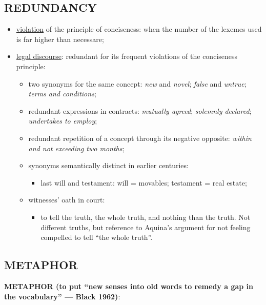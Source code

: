 \subsection{REDUNDANCY}

\begin{itemize}

\item \underline{violation} of the principle of conciseness: when the number of the lexemes used is far higher than necessare;
\item \underline{legal discourse}: redundant for its frequent violations of the conciseness principle:

\begin{itemize}

\item  two synonyms for the same concept: \textit{new} and \textit{novel}; \textit{false} and \textit{untrue}; \textit{terms and conditions};
\item redundant expressions in contracts: \textit{mutually agreed}; \textit{solemnly declared}; \textit{undertakes to employ};
\item redundant repetition of a concept through its negative opposite: \textit{within and not exceeding two months};
\item synonyms semantically distinct in earlier centuries:
\begin{itemize}
\item last will and testament: will = movables; testament = real estate;
\end{itemize}
\item witnesses’ oath in court:
\begin{itemize}
\item to tell the truth, the whole truth, and nothing than the truth. Not different truths, but reference to Aquina’s argument for not feeling compelled to tell “the whole truth”.
\end{itemize}
\end{itemize}

\end{itemize}

\subsection{METAPHOR}

\textbf{METAPHOR (to put “new senses into old words to remedy a gap in the vocabulary” — Black 1962)}:

